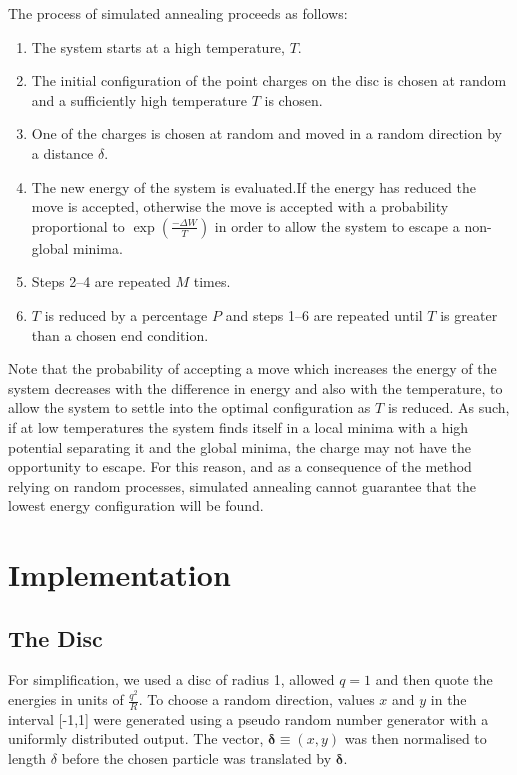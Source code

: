 \documentclass[12pt,a4paper,final]{iopart}
\newcommand{\vect}[1]{\boldsymbol{#1}}
\begin{document}
{The process of simulated annealing proceeds as follows:

\begin{enumerate}[1.]
\item The system starts at a high temperature, $T$.
\item The initial configuration of the point charges on the disc is chosen at random and a sufficiently high temperature $T$ is chosen. 
\item One of the charges is chosen at random and moved in a random direction by a distance $\delta$. 
\item The new energy of the system is evaluated.If the energy has reduced the move is accepted, otherwise the move is accepted with a probability proportional to $\exp(\frac{-\Delta W}{T})$ in order to allow the system to escape a non-global minima. 
\item Steps 2--4 are repeated $M$ times.
\item $T$ is reduced by a percentage $P$ and steps 1--6 are repeated until $T$ is greater than a chosen end condition.
\end{enumerate}

Note that the probability of accepting a move which increases the energy of the system decreases with the difference in energy and also with the temperature, to allow the system to settle into the optimal configuration as $T$ is reduced. As such, if at low temperatures the system finds itself in a local minima with a high potential separating it and the global minima, the charge may not have the opportunity to escape. For this reason, and as a consequence of the method relying on random processes, simulated annealing cannot guarantee that the lowest energy configuration will be found. 


\section{Implementation}

\subsection{The Disc}

For simplification, we used a disc of radius 1, allowed $q=1$ and then quote the energies in units of $\frac{q^2}{R}$. To choose a random direction, values $x$ and $y$ in the interval [-1,1] were generated using a pseudo random number generator with a uniformly distributed output. The vector, $\vect{\delta} \equiv (x,y)$ was then normalised to length $\delta$ before the chosen particle was translated by $\vect{\delta}$.

}
\end{document}
